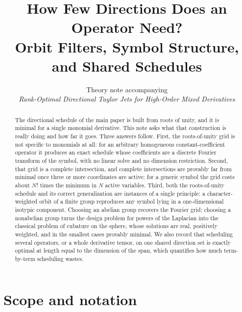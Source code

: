 \documentclass[final]{siamltex}
\begin{document}
\title{How Few Directions Does an Operator Need?\\
Orbit Filters, Symbol Structure, and Shared Schedules}

\author{Theory note accompanying\\
\emph{Rank-Optimal Directional Taylor Jets for High-Order Mixed Derivatives}}

\maketitle

\begin{abstract}
  The directional schedule of the main paper is built from roots of unity, and
  it is minimal for a single monomial derivative.  This note asks what that
  construction is really doing and how far it goes.  Three answers follow.
  First, the roots-of-unity grid is not specific to monomials at all: for an
  arbitrary homogeneous constant-coefficient operator it produces an exact
  schedule whose coefficients are a discrete Fourier transform of the symbol,
  with no linear solve and no dimension restriction.  Second, that grid is a
  complete intersection, and complete intersections are provably far from
  minimal once three or more coordinates are active; for a generic symbol the
  grid costs about $N!$ times the minimum in $N$ active variables.  Third, both
  the roots-of-unity schedule and its correct generalization are instances of a
  single principle: a character-weighted orbit of a finite group reproduces any
  symbol lying in a one-dimensional isotypic component.  Choosing an abelian
  group recovers the Fourier grid; choosing a nonabelian group turns the design
  problem for powers of the Laplacian into the classical problem of cubature on
  the sphere, whose solutions are real, positively weighted, and in the smallest
  cases provably minimal.  We also record that scheduling several operators, or
  a whole derivative tensor, on one shared direction set is exactly optimal at
  length equal to the dimension of the span, which quantifies how much
  term-by-term scheduling wastes.
\end{abstract}

\section{Scope and notation}\label{sec_scope}
\end{document}
